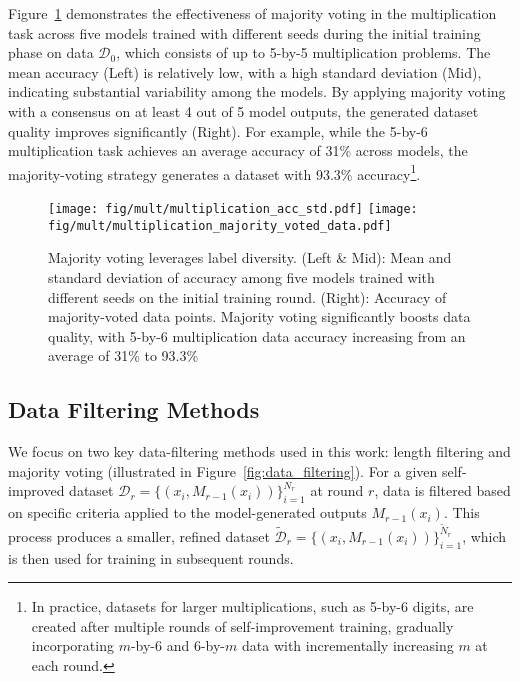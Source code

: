 Figure~\ref{fig:majority_vote} demonstrates the effectiveness of majority voting in the multiplication task across five models trained with different seeds during the initial training phase on data \( \mathcal{D}_0 \), which consists of up to 5-by-5 multiplication problems. The mean accuracy (Left) is relatively low, with a high standard deviation (Mid), indicating substantial variability among the models. By applying majority voting with a consensus on at least 4 out of 5 model outputs, the generated dataset quality improves significantly (Right). For example, while the 5-by-6 multiplication task achieves an average accuracy of 31\% across models, the majority-voting strategy generates a dataset with 93.3\% accuracy\footnote{
In practice, datasets for larger multiplications, such as 5-by-6 digits, are created after multiple rounds of self-improvement training, gradually incorporating \( m \)-by-6 and 6-by-\( m \) data with incrementally increasing \( m \) at each round.}.

\begin{figure}
    \centering
    \texttt{[image: fig/mult/multiplication\_acc\_std.pdf]}
    \hspace{1mm}
    \texttt{[image: fig/mult/multiplication\_majority\_voted\_data.pdf]}
    \caption{ Majority voting leverages label diversity. (Left \& Mid): Mean and standard deviation of accuracy among five models trained with different seeds on the initial training round. (Right): Accuracy of majority-voted data points. Majority voting significantly boosts data quality, with 5-by-6 multiplication data accuracy increasing from an average of 31\% to 93.3\% }
    \label{fig:majority_vote}
\end{figure}



\subsection{Data Filtering Methods}



We focus on two key data-filtering methods used in this work: length filtering and majority voting (illustrated in Figure~\ref{fig:data_filtering}).  For a given self-improved dataset \( \mathcal{D}_r = \{(x_i, M_{r-1}(x_i))\}_{i=1}^{N_r} \) at round \( r \), data is filtered based on specific criteria applied to the model-generated outputs \( M_{r-1}(x_i) \). This process produces a smaller, refined dataset \( \tilde{\mathcal{D}}_r = \{(x_i, M_{r-1}(x_i))\}_{i=1}^{\tilde{N}_r} \), which is then used for training in subsequent rounds. 


